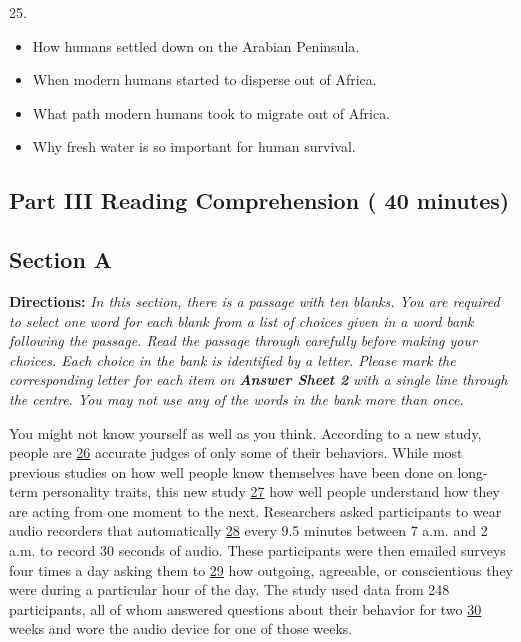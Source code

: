\documentclass[UTF8,11pt]{ctexart}
\begin{document}
25.


\begin{itemize}[leftmargin=2em,itemsep=.2em,topsep=.4em]\item[A.] How humans settled down on the Arabian Peninsula.
\item[B.] When modern humans started to disperse out of Africa.
\item[C.] What path modern humans took to migrate out of Africa.
\item[D.] Why fresh water is so important for human survival.
\end{itemize}

\subsection*{\textbf{Part III Reading Comprehension ( 40 minutes)}}


\subsection*{\textbf{Section A}}


\textbf{Directions:} \textit{In this section, there is a passage with ten blanks. You are required to select one word for each} \textit{blank from a list of choices given in a word bank following the passage. Read the passage through carefully} \textit{before making your choices. Each choice in the bank is identified by a letter. Please mark the corresponding} \textit{letter for each item on }\textbf{\textit{Answer Sheet 2}}\textit{ with a single line through the centre. You may not use any of the words} \textit{in the bank more than once.}


You might not know yourself as well as you think. According to a new study, people are \uline{26} accurate judges of only some of their behaviors. While most previous studies on how well people know themselves have been done on long-term personality traits, this new study \uline{27} how well people understand how they are acting from one moment to the next. Researchers asked participants to wear audio recorders that automatically \uline{28} every 9.5 minutes between 7 a.m. and 2 a.m. to record 30 seconds of audio. These participants were then emailed surveys four times a day asking them to \uline{29} how outgoing, agreeable, or conscientious they were during a particular hour of the day. The study used data from 248 participants, all of whom answered questions about their behavior for two \uline{30} weeks and wore the audio device for one of those weeks.
\end{document}

